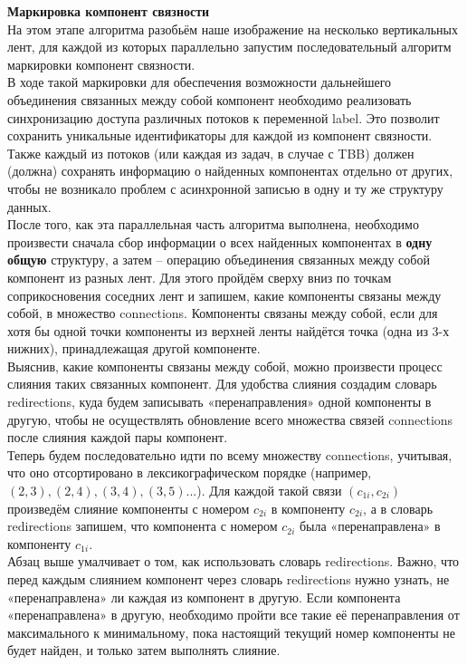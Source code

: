 \documentclass[14pt, russian]{extarticle}
\begin{document}
	\noindent\textbf{Маркировка компонент связности}\\
	\indent На этом этапе алгоритма разобьём наше изображение на несколько вертикальных лент, для каждой из которых параллельно запустим последовательный алгоритм маркировки компонент связности.\\
	\indent В ходе такой маркировки для обеспечения возможности дальнейшего объединения связанных между собой компонент необходимо реализовать синхронизацию доступа различных потоков к переменной label. Это позволит сохранить уникальные идентификаторы для каждой из компонент связности. Также каждый из потоков (или каждая из задач, в случае с TBB) должен (должна) сохранять информацию о найденных компонентах отдельно от других, чтобы не возникало проблем с асинхронной записью в одну и ту же структуру данных.\\
	\indent После того, как эта параллельная часть алгоритма выполнена, необходимо произвести сначала сбор информации о всех найденных компонентах в \textbf{одну общую} структуру, а затем – операцию объединения связанных между собой компонент из разных лент. Для этого пройдём сверху вниз по точкам соприкосновения соседних лент и запишем, какие компоненты связаны между собой, в множество connections. Компоненты связаны между собой, если для хотя бы одной точки компоненты из верхней ленты найдётся точка (одна из 3-х нижних), принадлежащая другой компоненте.\\
	\indent Выяснив, какие компоненты связаны между собой, можно произвести процесс слияния таких связанных компонент. Для удобства слияния создадим словарь redirections, куда будем записывать «перенаправления» одной компоненты в другую, чтобы не осуществлять обновление всего множества связей connections после слияния каждой пары компонент.\\
	\indent Теперь будем последовательно идти по всему множеству connections, учитывая, что оно отсортировано в лексикографическом порядке (например, $ (2, 3), (2, 4), (3, 4), (3, 5) ... $). Для каждой такой связи $ (c_{1i}, c_{2i}) $ произведём слияние компоненты с номером $ c_{2i} $ в компоненту $ c_{2i} $, а в словарь redirections запишем, что компонента с номером $ c_{2i} $ была «перенаправлена» в компоненту $ c_{1i} $.\\
	\indent Абзац выше умалчивает о том, как использовать словарь redirections. Важно, что перед каждым слиянием компонент через словарь redirections нужно узнать, не «перенаправлена» ли каждая из компонент в другую. Если компонента «перенаправлена» в другую, необходимо пройти все такие её перенаправления от максимального к минимальному, пока настоящий текущий номер компоненты не будет найден, и только затем выполнять слияние.
	
\end{document}
